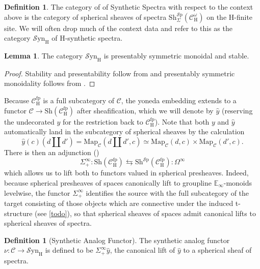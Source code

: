 \documentclass[10pt]{amsart}
\theoremstyle{definition}
\numberwithin{figure}{section}
\numberwithin{equation}{section}
\newtheorem{lemma}[figure]{Lemma}
\newtheorem{definition}[figure]{Definition}
\newcommand{\cC}{\mathcal{C}}
\theoremstyle{cited}
\newcommand{\bE}{\mathbb{E}}
\newcommand{\Sp}{{\mathcal{S}\mathrm{p}}}
\newcommand{\Map}{\mathrm{Map}}
\newcommand{\Sh}{\mathrm{Sh}}
\newcommand{\fp}{\mathrm{fp}}
\newcommand{\Syn}{\mathcal{S}\mathrm{yn}}
\renewcommand{\H}{\mathrm{H}}
\begin{document}
\begin{definition}
  The category of of Synthetic Spectra with respect to the context above is the category of spherical sheaves of spectra $\Sh^\Sp_\Sigma(\cC^\omega_\H)$ on the $\H$-finite site. We will often drop much of the context data and refer to this as the category $\Syn_\H$ of $\H$-synthetic spectra.
\end{definition}

\begin{lemma}
  The category $\Syn_\H$ is presentably symmetric monoidal and stable.
\end{lemma}

\begin{proof}
  Stability and presentability follow from \cite[Corollary 2.13]{Pst22} and presentably symmetric monoidality follows from \cite[Proposition 2.30]{Pst22}.
\end{proof}

Because $\cC_\H^\fp$ is a full subcategory of $\cC$, the yoneda embedding extends to a functor $\cC\to \Sh(\cC_\H^\fp)$ after sheafification, which we will denote by $\hat y$ (reserving the undecorated $y$ for the restriction back to $\cC^\fp_\H$). Note that both $y$ and $\hat y$ automatically land in the subcategory of spherical sheaves by the calculation
\[
  \hat y(c)(d\amalg d')=\Map_{\cC}(d\amalg d', c)\simeq \Map_{\cC}(d, c)\times \Map_{\cC}(d', c).
\]
There is then an adjunction (\cite{Pst22})
\[
\Sigma^\infty_+:\Sh(\cC_\H^\fp) \leftrightarrows \Sh^\Sp(\cC_\H^\fp):\Omega^\infty
\]
which allows us to lift both to functors valued in spherical presheaves. Indeed, because spherical presheaves of spaces canonically lift to groupline $\bE_\infty$-monoids levelwise, the functor $\Sigma_+^\infty$ identifies the source with the full subcategory of the target consisting of those objects which are connective under the induced t-structure (see \ref{todo}), so that spherical sheaves of spaces admit canonical lifts to spherical sheaves of spectra.

\begin{definition}[Synthetic Analog Functor]
  The synthetic analog functor $\nu:\cC\to \Syn_\H$ is defined to be $\Sigma_+^\infty \hat y$, the canonical lift of $\hat y$ to a spherical sheaf of spectra.
\end{definition}
\end{document}
